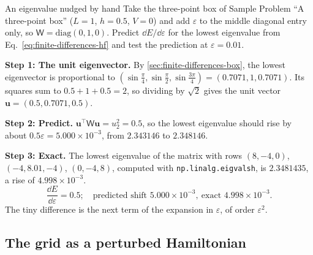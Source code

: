 \begin{sample}{An eigenvalue nudged by hand}
Take the three-point box of Sample Problem ``A three-point box'' ($L=1$, $h=0.5$, $V=0$) and add $\varepsilon$ to the middle diagonal entry only, so $\mathsf W=\mathrm{diag}(0,1,0)$. Predict $\dd E/\dd\varepsilon$ for the lowest eigenvalue from Eq.~\eqref{eq:finite-differences-hf} and test the prediction at $\varepsilon=0.01$.

\textbf{Step 1: The unit eigenvector.} By \cref{sec:finite-differences-box}, the lowest eigenvector is proportional to $(\sin\frac\pi4,\sin\frac\pi2,\sin\frac{3\pi}4)=(0.7071,1,0.7071)$. Its squares sum to $0.5+1+0.5=2$, so dividing by $\sqrt2$ gives the unit vector $\mathbf u=(0.5,0.7071,0.5)$.

\textbf{Step 2: Predict.} $\mathbf u^\top\mathsf W\mathbf u=u_2^2=0.5$, so the lowest eigenvalue should rise by about $0.5\varepsilon=5.000\times10^{-3}$, from $2.343146$ to $2.348146$.

\textbf{Step 3: Exact.} The lowest eigenvalue of the matrix with rows $(8,-4,0)$, $(-4,8.01,-4)$, $(0,-4,8)$, computed with \texttt{np.linalg.eigvalsh}, is $2.3481435$, a rise of $4.998\times10^{-3}$.
\begin{equation*}
\boxed{\frac{\dd E}{\dd\varepsilon}=0.5;\quad\text{predicted shift }5.000\times10^{-3},\ \text{exact }4.998\times10^{-3}.}
\end{equation*}
The tiny difference is the next term of the expansion in $\varepsilon$, of order $\varepsilon^2$.
\end{sample}

\subsection{The grid as a perturbed Hamiltonian}

